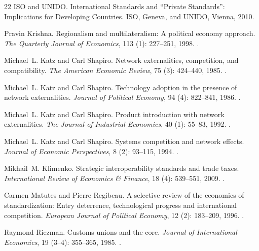 \documentclass[sn-mathphys-ay]{sn-jnl}
\theoremstyle{plain}
\theoremstyle{remark}
\begin{document}
\begin{thebibliography}{22}
{ISO} and {UNIDO}.
\newblock International Standards and ``Private Standards'': Implications for
  Developing Countries.
\newblock ISO, Geneva, and UNIDO, Vienna, 2010.

Pravin Krishna.
\newblock Regionalism and multilateralism: A political economy approach.
\newblock \emph{The Quarterly Journal of Economics}, 113
  (1): 227--251, 1998.
\newblock {}.

Michael~L. Katz and Carl Shapiro.
\newblock Network externalities, competition, and compatibility.
\newblock \emph{The American Economic Review}, 75 (3):
  424--440, 1985.
\newblock {}.

Michael~L. Katz and Carl Shapiro.
\newblock Technology adoption in the presence of network externalities.
\newblock \emph{Journal of Political Economy}, 94 (4):
  822--841, 1986.
\newblock {}.

Michael~L. Katz and Carl Shapiro.
\newblock Product introduction with network externalities.
\newblock \emph{The Journal of Industrial Economics}, 40 (1):
  55--83, 1992.
\newblock {}.

Michael~L. Katz and Carl Shapiro.
\newblock Systems competition and network effects.
\newblock \emph{Journal of Economic Perspectives}, 8 (2):
  93--115, 1994.
\newblock {}.

Mikhail~M. Klimenko.
\newblock Strategic interoperability standards and trade taxes.
\newblock \emph{International Review of Economics \& Finance}, 18
  (4): 539--551, 2009.
\newblock {}.

Carmen Matutes and Pierre Regibeau.
\newblock A selective review of the economics of standardization: Entry
  deterrence, technological progress and international competition.
\newblock \emph{European Journal of Political Economy}, 12
  (2): 183--209, 1996.
\newblock {}.

Raymond Riezman.
\newblock Customs unions and the core.
\newblock \emph{Journal of International Economics}, 19
  (3--4): 355--365, 1985.
\newblock {}.


\end{thebibliography}
\end{document}
